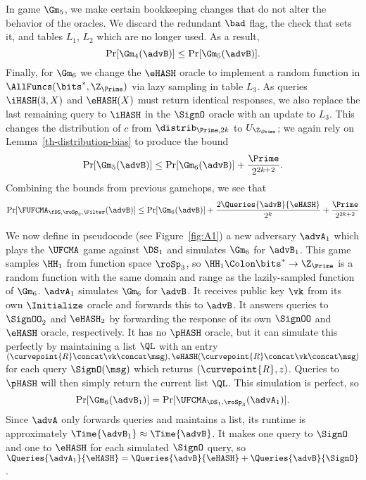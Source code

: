 	In game $\Gm_5$,  we make certain bookkeeping changes that do not alter the behavior of the oracles. We discard the redundant $\bad$ flag, the check that sets it, and tables $L_1$, $L_2$ which are no longer used. 
	As a result,
	\[\Pr[\Gm_4(\advB)] \leq \Pr[\Gm_5(\advB)].\]
	Finally, for $\Gm_6$ we change the $\eHASH$ oracle to implement a random function in $\AllFuncs(\bits^{*},\Z_{\Prime})$ via lazy sampling in table $L_3$.
	As queries $\iHASH(3, X)$ and $\eHASH(X)$ must return identical responses, we also replace the last remaining query to $\iHASH$ in the $\SignO$ oracle with an update to $L_3$. 
	This changes the distribution of $c$ from $\distrib_{\Prime, 2k}$ to $U_{\Z_{\Prime}}$; we again rely on Lemma~\ref{th-distribution-bias} to produce the bound
	\[\Pr[\Gm_5(\advB)] \leq \Pr[\Gm_6(\advB)] + \frac{\Prime}{2^{2k+2}}.\]
	Combining the bounds from previous gamehops, we see that
	\[\Pr[\FUFCMA_{\fDS,\roSp_2,\Filter}(\advB)] \leq \Pr[\Gm_6(\advB)] + \frac{2\Queries{\advB}{\eHASH}}{2^k} + \frac{\Prime}{2^{2k+2}}\]
	
	We now define in pseudocode (see Figure~\ref{fig:A1}) a new adversary $\advA_1$ which plays the $\UFCMA$ game against $\DS_1$ and simulates $\Gm_6$ for $\advB_1$.
	This game samples $\HH_1$ from function space $\roSp_3$, so $\HH_1\Colon\bits^*\to\Z_{\Prime}$ is a random function with the same domain and range as the lazily-sampled function of $\Gm_6$.
	$\advA_1$ simulates $\Gm_6$ for $\advB$.
	It receives public key $\vk$ from its own $\Initialize$ oracle and forwards this to $\advB$. 
	It answers queries to $\SignOO_2$ and $\eHASH_2$ by forwarding the response of its own $\SignOO$ and $\eHASH$ oracle, respectively.
	It has no $\pHASH$ oracle, but it can simulate this perfectly by maintaining a list $\QL$ with an entry $(\curvepoint{R} \concat \vk \concat \msg), \eHASH(\curvepoint{R} \concat \vk \concat \msg)$ for each query $\SignO(\msg)$ which returns $(\curvepoint{R}, z)$.
	Queries to $\pHASH$ will then simply return the current list $\QL$.
	This simulation is perfect, so 
	\[\Pr[\Gm_6(\advB_1)] = \Pr[\UFCMA_{\DS_1, \roSp_3}(\advA_1)].\]
	Since $\advA$ only forwards queries and maintains a list, its runtime is approximately $\Time{\advB_1} \approx \Time{\advB}$. It makes one query to $\SignO$ and one to $\eHASH$ for each simulated $\SignO$ query, so $\Queries{\advA_1}{\eHASH} = \Queries{\advB}{\eHASH}+ \Queries{\advB}{\SignO}$.
	

